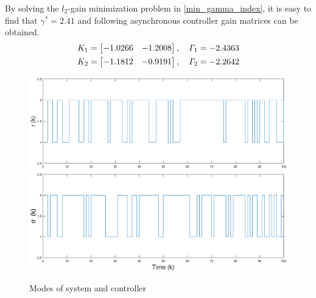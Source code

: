 \documentclass[conference]{IEEEtran}
\begin{document}
By solving the $l_2$-gain minimization problem in \eqref{min_gamma_index}, it is easy to find that $\gamma^{*}=2.41$ and following asynchronous controller gain matrices can be obtained.
\begin{equation}\notag
	\begin{aligned}
		K_{1}=\begin{bmatrix}
			-1.0266&-1.2008
		\end{bmatrix},\quad
		\varGamma_{1}=-2.4363 \\
		K_{2}=\begin{bmatrix}
		-1.1812&-0.9191
		\end{bmatrix},\quad
		\varGamma_{2}=-2.2642
	\end{aligned}
\end{equation}

\begin{figure}[!htb]
	\centering\includegraphics[scale=0.25]{./simulink/mode_p.eps}\\ 
	\centering\includegraphics[scale=0.25]{./simulink/mode_k.eps}\\ 
	\caption{Modes of system and controller}
	\label{fig.1}
\end{figure}
\end{document}
